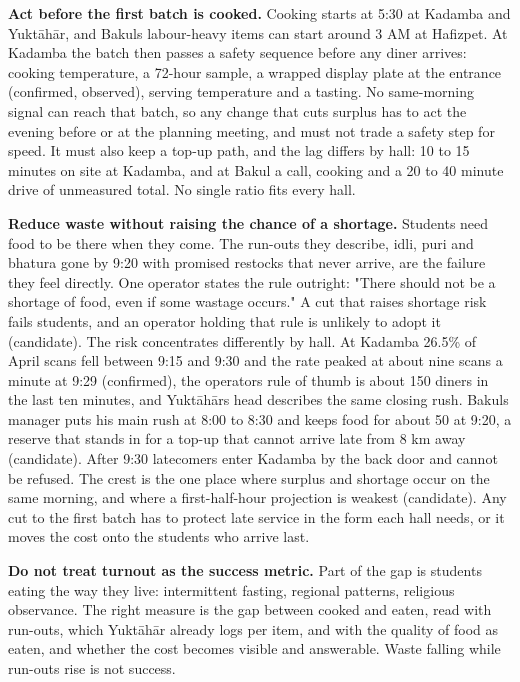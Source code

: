 \documentclass[
  10pt,
  table]{article}
\begin{document}
\textbf{Act before the first batch is cooked.} Cooking starts at 5:30 at Kadamba and Yuktāhār, and Bakul\textquotesingle s labour-heavy items can start around 3 AM at Hafizpet. At Kadamba the batch then passes a safety sequence before any diner arrives: cooking temperature, a 72-hour sample, a wrapped display plate at the entrance (confirmed, observed), serving temperature and a tasting. No same-morning signal can reach that batch, so any change that cuts surplus has to act the evening before or at the planning meeting, and must not trade a safety step for speed. It must also keep a top-up path, and the lag differs by hall: 10 to 15 minutes on site at Kadamba, and at Bakul a call, cooking and a 20 to 40 minute drive of unmeasured total. No single ratio fits every hall.

\textbf{Reduce waste without raising the chance of a shortage.} Students need food to be there when they come. The run-outs they describe, idli, puri and bhatura gone by 9:20 with promised restocks that never arrive, are the failure they feel directly. One operator states the rule outright: "There should not be a shortage of food, even if some wastage occurs." A cut that raises shortage risk fails students, and an operator holding that rule is unlikely to adopt it (candidate). The risk concentrates differently by hall. At Kadamba 26.5\% of April scans fell between 9:15 and 9:30 and the rate peaked at about nine scans a minute at 9:29 (confirmed), the operator\textquotesingle s rule of thumb is about 150 diners in the last ten minutes, and Yuktāhār\textquotesingle s head describes the same closing rush. Bakul\textquotesingle s manager puts his main rush at 8:00 to 8:30 and keeps food for about 50 at 9:20, a reserve that stands in for a top-up that cannot arrive late from 8 km away (candidate). After 9:30 latecomers enter Kadamba by the back door and cannot be refused. The crest is the one place where surplus and shortage occur on the same morning, and where a first-half-hour projection is weakest (candidate). Any cut to the first batch has to protect late service in the form each hall needs, or it moves the cost onto the students who arrive last.

\textbf{Do not treat turnout as the success metric.} Part of the gap is students eating the way they live: intermittent fasting, regional patterns, religious observance. The right measure is the gap between cooked and eaten, read with run-outs, which Yuktāhār already logs per item, and with the quality of food as eaten, and whether the cost becomes visible and answerable. Waste falling while run-outs rise is not success.
\end{document}
